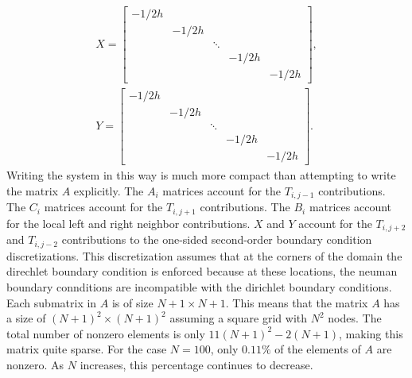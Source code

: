 \documentclass[reqno, 12pt]{amsart}
\begin{document}
\begin{gather*}
        X = \begin{bmatrix} -1/2h \\ & -1/2h \\ & & \ddots \\ & & & -1/2h \\ & & & & -1/2h \end{bmatrix}, \\
        Y = \begin{bmatrix} -1/2h \\ & -1/2h \\ && \ddots \\ & & & -1/2h \\ & & & & -1/2h \end{bmatrix}.
    \end{gather*}
    Writing the system in this way is much more compact than attempting to write the matrix $A$ explicitly.
    The $A_i$ matrices account for the $T_{i, j-1}$ contributions.
    The $C_i$ matrices account for  the $T_{i, j+1}$ contributions.
    The $B_i$ matrices account for the local left and right neighbor contributions.
    $X$ and $Y$ account for the $T_{i, j + 2}$ and $T_{i, j - 2}$ contributions to the one-sided second-order boundary condition discretizations.
    This discretization assumes that at the corners of the domain the direchlet boundary condition is enforced because at these locations, the neuman boundary connditions are incompatible with the dirichlet boundary conditions.
    Each submatrix in $A$ is of size $N + 1\times N + 1$.
    This means that the matrix $A$ has a size of $(N + 1)^2\times(N+1)^2$ assuming a square grid with $N^2$ nodes.
    The total number of nonzero elements is only $11(N+1)^2 - 2(N+1)$, making this matrix quite sparse.
    For the case $N = 100$, only $0.11\%$ of the elements of $A$ are nonzero.
    As $N$ increases, this percentage continues to decrease.
\end{document}
